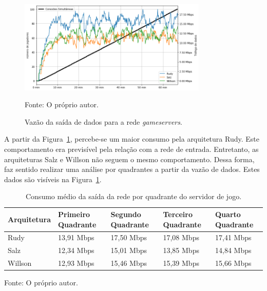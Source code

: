 \begin{figure}[htb!]
  \caption{Vazão da saída de dados para a rede \textit{gameservers}.}
  \label{fig:net_in_gs}
  \includegraphics[width=0.8\textwidth]{figuras/analise/net_in_gs.png}
  \centering

  Fonte: O próprio autor.
\end{figure}

A partir da Figura~\ref{fig:net_in_gs}, percebe-se um maior consumo pela arquitetura Rudy.
%
Este comportamento era previsível pela relação com a rede de entrada.
%
Entretanto, as arquiteturas Salz e Willson não seguem o mesmo comportamento.
%
Dessa forma, faz sentido realizar uma análise por quadrantes a partir da vazão de dados.
%
Estes dados são visíveis na Figura~\ref{tab:net_out_gs_media_quadrantes}.

\begin{table}[htb!]
\centering
\begin{adjustbox}{max width=\textwidth}
\caption{Consumo médio da saída da rede por quadrante do servidor de jogo.}
\label{tab:net_out_gs_media_quadrantes}

\begin{tabular}{l|l|l|l|l}
\hline \hline
Arquitetura & Primeiro Quadrante & Segundo Quadrante & Terceiro Quadrante & Quarto Quadrante \\ \hline \hline
Rudy        & 13,91 Mbps            & 17,50 Mbps           & 17,08 Mbps            & 17,41 Mbps          \\ \hline
Salz        & 12,34 Mbps            & 15,01 Mbps           & 13,85 Mbps            & 14,84 Mbps          \\ \hline
Willson     & 12,93 Mbps            & 15,46 Mbps          & 15,39 Mbps            & 15,66 Mbps          \\ \hline \hline
\end{tabular}
\end{adjustbox}

Fonte: O próprio autor.
\end{table}

